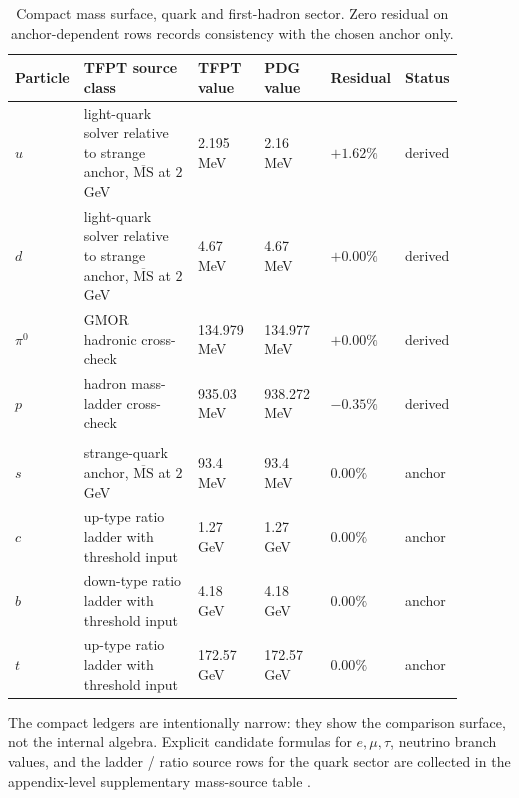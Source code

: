 \documentclass[11pt,a4paper]{article}
\theoremstyle{definition}
\theoremstyle{remark}
\begin{document}
\begin{table}[p]
\centering
\scriptsize
\setlength{\tabcolsep}{3pt}
\begin{tabularx}{\linewidth}{@{}>{\raggedright\arraybackslash}p{0.10\linewidth}>{\raggedright\arraybackslash}p{0.27\linewidth}>{\raggedleft\arraybackslash}p{0.15\linewidth}>{\raggedleft\arraybackslash}p{0.15\linewidth}>{\raggedleft\arraybackslash}p{0.10\linewidth}>{\raggedright\arraybackslash}p{0.12\linewidth}@{}}
\toprule
Particle & TFPT source class & TFPT value & PDG value & Residual & Status \\
\midrule
$u$ & light-quark solver relative to strange anchor, $\overline{\mathrm{MS}}$ at $2$ GeV & \num{2.195} MeV & \num{2.16} MeV & $+1.62\%$ & derived \\
$d$ & light-quark solver relative to strange anchor, $\overline{\mathrm{MS}}$ at $2$ GeV & \num{4.67} MeV & \num{4.67} MeV & $+0.00\%$ & derived \\
$\pi^0$ & GMOR hadronic cross-check & \num{134.979} MeV & \num{134.977} MeV & $+0.00\%$ & derived \\
$p$ & hadron mass-ladder cross-check & \num{935.03} MeV & \num{938.272} MeV & $-0.35\%$ & derived \\
\midrule
\multicolumn{6}{@{}l}{\textit{Calibration surface (anchor-dependent):}} \\
$s$ & strange-quark anchor, $\overline{\mathrm{MS}}$ at $2$ GeV & \num{93.4} MeV & \num{93.4} MeV & $0.00\%$ & anchor \\
$c$ & up-type ratio ladder with threshold input & \num{1.27} GeV & \num{1.27} GeV & $0.00\%$ & anchor \\
$b$ & down-type ratio ladder with threshold input & \num{4.18} GeV & \num{4.18} GeV & $0.00\%$ & anchor \\
$t$ & up-type ratio ladder with threshold input & \num{172.57} GeV & \num{172.57} GeV & $0.00\%$ & anchor \\
\bottomrule
\end{tabularx}
\caption{Compact mass surface, quark and first-hadron sector. Zero residual on anchor-dependent rows records consistency with the chosen anchor only.}
\label{tab:sm-mass-ledger-quarks}
\end{table}

The compact ledgers are intentionally narrow: they show the comparison surface, not the internal algebra. Explicit candidate formulas for $e,\mu,\tau$, neutrino branch values, and the ladder / ratio source rows for the quark sector are collected in the appendix-level supplementary mass-source table .
\end{document}
